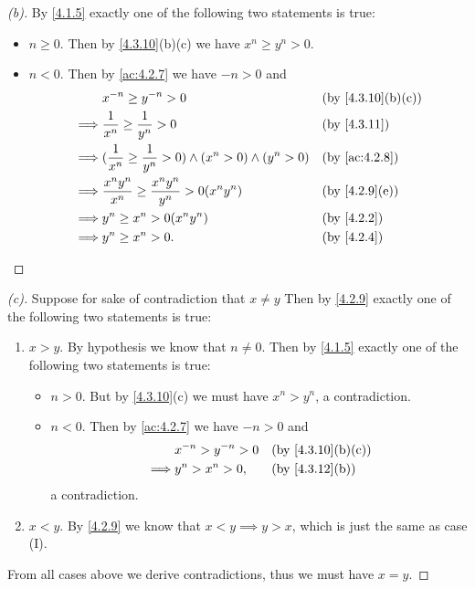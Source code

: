 \begin{proof}[(b)]
  By \cref{4.1.5} exactly one of the following two statements is true:
  \begin{itemize}
    \item \(n \geq 0\).
          Then by \cref{4.3.10}(b)(c) we have \(x^n \geq y^n > 0\).
    \item \(n < 0\).
          Then by \cref{ac:4.2.7} we have \(-n > 0\) and
          \begin{align*}
                     & x^{-n} \geq y^{-n} > 0                                                   &  & \by{4.3.10}[b,c] \\
            \implies & \dfrac{1}{x^n} \geq \dfrac{1}{y^n} > 0                                   &  & \by{4.3.11}      \\
            \implies & (\dfrac{1}{x^n} \geq \dfrac{1}{y^n} > 0) \land (x^n > 0) \land (y^n > 0) &  & \by{ac:4.2.8}    \\
            \implies & \dfrac{x^n y^n}{x^n} \geq \dfrac{x^n y^n}{y^n} > 0(x^n y^n)              &  & \by{4.2.9}[e]    \\
            \implies & y^n \geq x^n > 0(x^n y^n)                                                &  & \by{4.2.2}       \\
            \implies & y^n \geq x^n > 0.                                                        &  & \by{4.2.4}
          \end{align*}
  \end{itemize}
\end{proof}

\begin{proof}[(c)]
  Suppose for sake of contradiction that \(x \neq y\)
  Then by \cref{4.2.9} exactly one of the following two statements is true:
  \begin{enumerate}[label=(\Roman*)]
    \item \(x > y\).
          By hypothesis we know that \(n \neq 0\).
          Then by \cref{4.1.5} exactly one of the following two statements is true:
          \begin{itemize}
            \item \(n > 0\).
                  But by \cref{4.3.10}(c) we must have \(x^n > y^n\), a contradiction.
            \item \(n < 0\).
                  Then by \cref{ac:4.2.7} we have \(-n > 0\) and
                  \begin{align*}
                             & x^{-n} > y^{-n} > 0 &  & \by{4.3.10}[b,c] \\
                    \implies & y^n > x^n > 0,      &  & \by{4.3.12}[b]
                  \end{align*}
                  a contradiction.
          \end{itemize}
    \item \(x < y\).
          By \cref{4.2.9} we know that \(x < y \implies y > x\), which is just the same as case (I).
  \end{enumerate}
  From all cases above we derive contradictions, thus we must have \(x = y\).
\end{proof}

